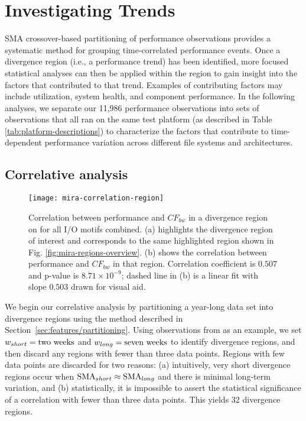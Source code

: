 \section{Investigating Trends}\label{sec:results}

SMA crossover-based partitioning of performance observations provides
a systematic method for grouping time-correlated performance events.
Once a divergence region (i.e., a performance trend) has been identified,
more focused statistical analyses can then be applied within the region
to gain insight into the factors that contributed to that trend.  Examples of
contributing factors may include utilization, system health, and component performance.
In the following analyses, we separate our 11,986 performance observations into sets of observations that all ran on the same test platform (as described in Table \ref{tab:platform-descriptions}) to characterize the factors that contribute to time-dependent performance variation across different file systems and architectures.

\subsection{Correlative analysis} \label{sec:results/correlate-mira}

\begin{figure}
    \centering
    \texttt{[image: mira-correlation-region]}
    \vspace{-.35in}
    \caption{Correlation between performance and $CF_{bw}$ in a divergence region on \mira for all I/O motifs combined.
    (a) highlights the divergence region of interest and corresponds to the same highlighted region shown in Fig. \ref{fig:mira-regions-overview}. (b) shows the correlation between performance and $CF_{bw}$ in that region.
    Correlation coefficient is $0.507$ and p-value is ${8.71 \times 10^{-9}}$; dashed line in (b) is a linear fit with slope $0.503$ drawn for visual aid.}
    \label{fig:mira-correlation-region}
\end{figure}


We begin our correlative analysis by partitioning a year-long data set into
divergence regions using the method described in
Section~\ref{sec:features/partitioning}.  Using observations from \mira
\mirafsone as an example, we set ${w_{short} = \textup{two weeks}}$ and ${w_{long}
= \textup{seven weeks}}$ to identify divergence regions, and then discard any
regions with fewer than three data points.  Regions with few data points are discarded
for two reasons: (a) intuitively, very short divergence regions occur
when $\textup{SMA}_{short} \approx \textup{SMA}_{long}$ and there is
minimal long-term variation, and (b) statistically, it is impossible
to assert the statistical significance of a correlation with fewer than
three data points.  This yields 32 divergence regions.

